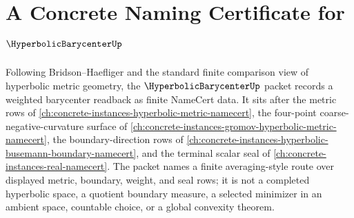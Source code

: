 \chapter{A Concrete Naming Certificate for $\HyperbolicBarycenterUp$}
\label{ch:concrete-instances-hyperbolic-barycenter-namecert}

Following Bridson--Haefliger and the standard finite comparison view of hyperbolic metric geometry, the $\HyperbolicBarycenterUp$ packet records a weighted barycenter readback as finite NameCert data. It sits after the metric rows of \autoref{ch:concrete-instances-hyperbolic-metric-namecert}, the four-point coarse-negative-curvature surface of \autoref{ch:concrete-instances-gromov-hyperbolic-metric-namecert}, the boundary-direction rows of \autoref{ch:concrete-instances-hyperbolic-busemann-boundary-namecert}, and the terminal scalar seal of \autoref{ch:concrete-instances-real-namecert}. The packet names a finite averaging-style route over displayed metric, boundary, weight, and seal rows; it is not a completed hyperbolic space, a quotient boundary measure, a selected minimizer in an ambient space, countable choice, or a global convexity theorem.

